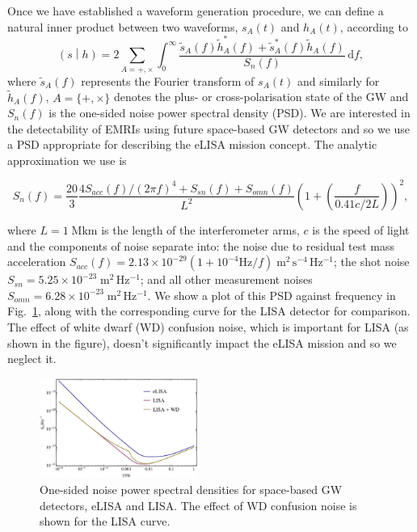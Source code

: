 \documentclass[aps,prd,amsfonts,amssymb,amsmath,nofootinbib,reprint,showpacs,superscriptaddress,twocolumn]{revtex4}
\newcommand{\figref}[1]{Fig.\ \ref{fig:#1}}
\newcommand{\dd}{\ensuremath{\mathrm{d}}}
\newcommand{\intd}[4]{\ensuremath{\int_{#1}^{#2}{#3}\,\dd{#4}}}
\newcommand{\overlap}[2]{\ensuremath{\left(#1\middle|#2\right)}}
\begin{document}
Once we have established a waveform generation procedure, we can define a natural inner product between two waveforms, $s_A(t)$ and $h_A(t)$, according to
\begin{equation}
\label{eq:innerprod}
\overlap{s}{h} = 2 \sum_{A=+,\times}\intd{0}{\infty}{\frac{\tilde{s}_A(f)\tilde{h}_A^*(f)+\tilde{s}_A^*(f)\tilde{h}_A(f)}{S_n(f)}}{f},
\end{equation}
where $\tilde{s}_A(f)$ represents the Fourier transform of $s_A(t)$ and similarly for $\tilde{h}_A(f)$, $A = \{+,\times\}$ denotes the plus- or cross-polarisation state of the GW and $S_n(f)$ is the one-sided noise power spectral density (PSD). We are interested in the detectability of EMRIs using future space-based GW detectors and so we use a PSD appropriate for describing the eLISA mission concept. The analytic approximation we use is~\cite{Amaro-Seoane2012a}
\begin{widetext}\begin{equation}
S_n(f) = \frac{20}{3}\frac{4 S_{acc}(f)/(2\pi f)^4 + S_{sn}(f) + S_{omn}(f)}{L^2} \left(1+\left(\frac{f}{0.41 c/2L}\right)\right)^2,
\end{equation}\end{widetext}
where $L = 1\;\mathrm{Mkm}$ is the length of the interferometer arms, $c$ is the speed of light and the components of noise separate into: the noise due to residual test mass acceleration $S_{acc}(f) = 2.13\times10^{-29}(1+10^{-4}\mathrm{Hz}/f)\;\mathrm{m^2\,s^{-4}\,Hz^{-1}}$; the shot noise $S_{sn} = 5.25\times10^{-23}\;\mathrm{m^2\,Hz^{-1}}$; and all other measurement noises $S_{omn} = 6.28\times10^{-23}\;\mathrm{m^2\,Hz^{-1}}$. We show a plot of this PSD against frequency in \figref{noise-curves}, along with the corresponding curve for the LISA detector for comparison. The effect of white dwarf (WD) confusion noise, which is important for LISA (as shown in the figure), doesn't significantly impact the eLISA mission and so we neglect it.

\begin{figure}[htbp]
\centering
\includegraphics[width=0.46\textwidth]{Fig_noise_curves}
\caption{\label{fig:noise-curves}One-sided noise power spectral densities for space-based GW detectors, eLISA and LISA. The effect of WD confusion noise is shown for the LISA curve.}
\end{figure}
\end{document}
